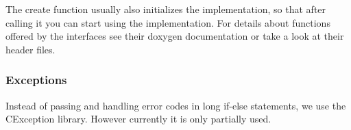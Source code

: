 The create function usually also initializes the implementation, so that after calling it you can start using the implementation. For details about functions offered by the interfaces see their doxygen documentation or take a look at their header files.

\subsubsection*{Exceptions}

Instead of passing and handling error codes in long if-\/else statements, we use the C\+Exception library. However currently it is only partially used. 